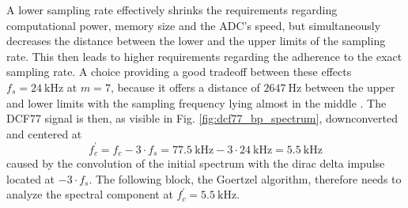 \documentclass[conference]{IEEEtran}
\begin{document}
\par
A lower sampling rate effectively shrinks the requirements regarding computational power, memory size and the ADC's speed, but simultaneously decreases the
distance between the lower and the upper limits of the sampling rate.
This then leads to higher requirements regarding the adherence to the exact sampling rate.
A choice providing a good tradeoff between these effects $f_{s} = \SI{24}{\kilo\hertz}$ at $m = 7$, because it offers a distance of $\SI{2647}{\hertz}$ between the upper and lower limits with the sampling frequency lying almost in the middle \cite{b10}.
The DCF77 signal is then, as visible in Fig. \ref{fig:dcf77_bp_spectrum}, downconverted and centered at
\begin{equation}
    f_{c}^{'} = f_{c} - 3 \cdot f_{s} = \SI{77.5}{\kilo\hertz} - 3 \cdot \SI{24}{\kilo\hertz} = \SI{5.5}{\kilo\hertz}
\end{equation}
caused by the convolution of the initial spectrum with the dirac delta impulse located at $-3 \cdot f_{s}$. 
The following block, the Goertzel algorithm, therefore needs to analyze the spectral component at $f_{c}^{'} = \SI{5.5}{\kilo\hertz}$.
\end{document}
